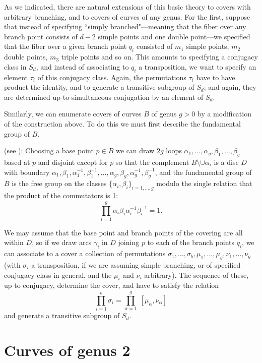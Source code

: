 As we indicated, there are natural extensions of this basic theory to covers with arbitrary branching, and to covers of curves of any genus. For the first, suppose that instead of specifying ``simply branched"---meaning that the fiber over any branch point consists of $d-2$ simple points and one double point---we specified that the fiber over a given branch point $q_i$ consisted of $m_1$ simple points, $m_2$ double points, $m_3$ triple points and so on. This amounts to specifying a conjugacy class in $S_d$, and instead of associating to $q_i$ a transposition, we want to specify an element $\tau_i$ of this conjugacy class. Again, the permutations $\tau_i$ have to have product the identity, and to generate a transitive subgroup of $S_d$; and again, they are determined up to simultaneous conjugation by an element of $S_d$.


Similarly, we can enumerate covers of curves $B$ of genus $g>0$ by a modification of the construction above. To do this we must first describe the fundamental group of $B$.
\begin{fact}
  (see \cite[Ch 13]{Munkres}):
Choosing a base point $p \in B$ we can draw $2g$ loops $\alpha_1,\dots,\alpha_{g},\beta_1, \dots, \beta_g$ based at $p$ and disjoint except for $p$ so that the complement $B \setminus \cup \alpha_i$ is a disc $D$ with boundary $\alpha_1, \beta_1, \alpha_1^{-1}, \beta_1^{-1}, \dots, \alpha_g, \beta_g, \alpha_g^{-1}, \beta_g^{-1}$,
and the fundamental group of $B$ is the free group on the classes $\{\alpha_i, \beta_i\}_{i=1,\dots,g}$
modulo the single relation that the product of the commutators is 1:
$$
\prod_{i=1}^g \alpha_i\beta_i\alpha_i^{-1}\beta_i^{-1} = 1.
$$
\end{fact}
We may assume that the base point and branch points of the covering are all within $D$, so if we draw arcs $\gamma_i$ in $D$ joining $p$ to each of the branch points $q_i$, we can associate to a cover a collection of permutations $\sigma_1, \dots, \sigma_b, \mu_1,\dots,\mu_g, \nu_1,\dots,\nu_g$ (with $\sigma_i$ a transposition, if we are assuming simple branching, or of specified conjugacy class in general, and the $\mu_i$ and $\nu_i$ arbitrary). The sequence of these, up to conjugacy, determine the cover, and have to satisfy the relation
$$
\prod_{i=1}^b \sigma_i = \prod_{\alpha=1}^g \; [\mu_\alpha, \nu_\alpha]
$$
and generate a transitive subgroup of $S_d$.


\section{Curves of genus 2}\label{genus 2 section}


